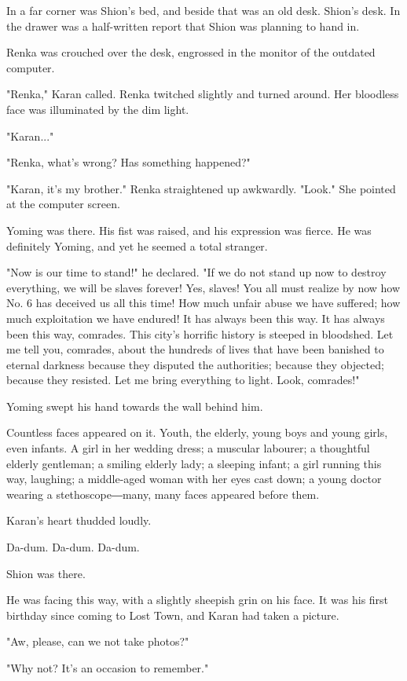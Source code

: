 In a far corner was Shion's bed, and beside that was an old desk.
Shion's desk. In the drawer was a half-written report that Shion was
planning to hand in.

Renka was crouched over the desk, engrossed in the monitor of the
outdated computer.

"Renka," Karan called. Renka twitched slightly and turned around. Her
bloodless face was illuminated by the dim light.

"Karan..."

"Renka, what's wrong? Has something happened?"

"Karan, it's my brother." Renka straightened up awkwardly. "Look." She
pointed at the computer screen.

Yoming was there. His fist was raised, and his expression was fierce. He
was definitely Yoming, and yet he seemed a total stranger.

"Now is our time to stand!" he declared. "If we do not stand up now to
destroy everything, we will be slaves forever! Yes, slaves! You all must
realize by now how No. 6 has deceived us all this time! How much unfair
abuse we have suffered; how much exploitation we have endured! It has
always been this way. It has always been this way, comrades. This city's
horrific history is steeped in bloodshed. Let me tell you, comrades,
about the hundreds of lives that have been banished to eternal darkness
because they disputed the authorities; because they objected; because
they resisted. Let me bring everything to light. Look, comrades!"

Yoming swept his hand towards the wall behind him.

Countless faces appeared on it. Youth, the elderly, young boys and young
girls, even infants. A girl in her wedding dress; a muscular labourer; a
thoughtful elderly gentleman; a smiling elderly lady; a sleeping infant;
a girl running this way, laughing; a middle-aged woman with her eyes
cast down; a young doctor wearing a stethoscope―many, many faces
appeared before them.

Karan's heart thudded loudly.

Da-dum. Da-dum. Da-dum.

Shion was there.

He was facing this way, with a slightly sheepish grin on his face. It
was his first birthday since coming to Lost Town, and Karan had taken a
picture.

"Aw, please, can we not take photos?"

"Why not? It's an occasion to remember."

